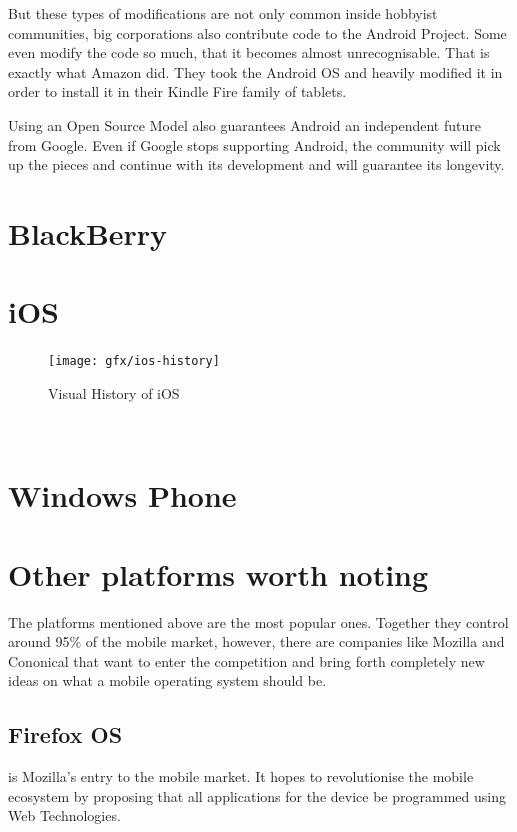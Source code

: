 But these types of modifications are not only common inside hobbyist communities, big corporations also contribute code to the Android Project. Some even modify the code so much, that it becomes almost unrecognisable. That is exactly what Amazon did. They took the Android OS and heavily modified it in order to install it in their Kindle Fire family of tablets.


Using an Open Source Model also guarantees Android an independent future from Google. Even if Google stops supporting  Android, the community will pick up the pieces and continue with its development and will guarantee its longevity.
 
\section{BlackBerry}
\section{iOS}
\begin{figure}[H]
    \begin{center}
        {\texttt{[image: gfx/ios-history]}}
        \caption[Visual History of iOS]{Visual History of iOS\footnotemark}\label{fig:ios}
    \end{center}
\end{figure}
\\

\section{Windows Phone}
\section{Other platforms worth noting}
The platforms mentioned above are the most popular ones. Together they control around 95\% of the mobile market, however, there are companies like Mozilla and Cononical that want to enter the competition and bring forth completely new ideas on what a mobile operating system should be.

\subsection{Firefox OS}
 is Mozilla's entry to the mobile market. It hopes to revolutionise the mobile ecosystem by proposing that all applications for the device be programmed using Web Technologies.

